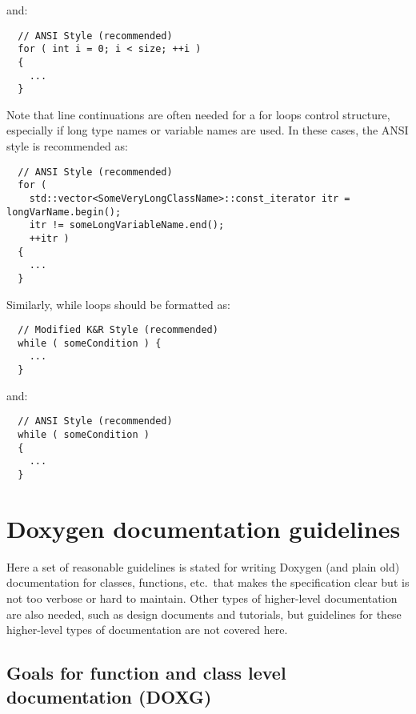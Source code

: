 \begin{enumerate}
\begin{enumerate}
  {}\noindent{}and:

  {\small\begin{verbatim}
  // ANSI Style (recommended)
  for ( int i = 0; i < size; ++i )
  {
    ...
  }
  \end{verbatim}}

  Note that line continuations are often needed for a for loops control
  structure, especially if long type names or variable names are used.  In
  these cases, the ANSI style is recommended as:

  {\small\begin{verbatim}
  // ANSI Style (recommended)
  for (
    std::vector<SomeVeryLongClassName>::const_iterator itr = longVarName.begin();
    itr != someLongVariableName.end();
    ++itr )
  {
    ...
  }
  \end{verbatim}}

  Similarly, while loops should be formatted as:

  {\small\begin{verbatim}
  // Modified K&R Style (recommended)
  while ( someCondition ) {
    ...
  }
  \end{verbatim}}

  {}\noindent{}and:

  {\small\begin{verbatim}
  // ANSI Style (recommended)
  while ( someCondition )
  {
    ...
  }
  \end{verbatim}}

  \end{enumerate}

\end{enumerate}

%
\section{Doxygen documentation guidelines}
%

Here a set of reasonable guidelines is stated for writing Doxygen (and plain
old) documentation for classes, functions, etc.\ that makes the specification
clear but is not too verbose or hard to maintain.  Other types of higher-level
documentation are also needed, such as design documents and tutorials, but
guidelines for these higher-level types of documentation are not covered here.

%
\subsection{Goals for function and class level documentation (DOXG)}
%

